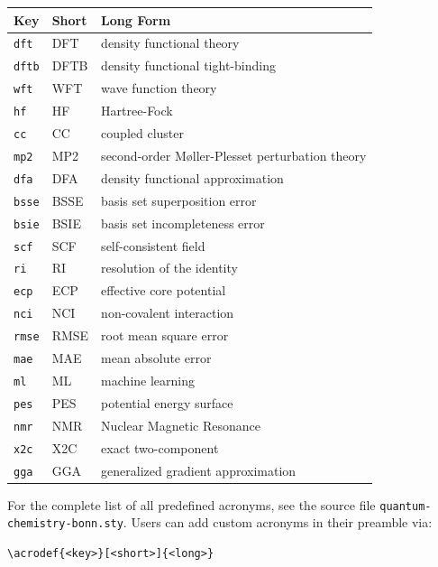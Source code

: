 \documentclass[a4paper,12pt]{article}
\begin{document}
\bigskip
\begin{tabular}{@{}llp{7.5cm}@{}}
\textbf{Key} & \textbf{Short} & \textbf{Long Form} \\
\midrule
\texttt{dft}   & DFT     & density functional theory \\
\texttt{dftb}  & DFTB    & density functional tight-binding \\
\texttt{wft}   & WFT     & wave function theory \\
\texttt{hf}    & HF      & Hartree-Fock \\
\texttt{cc}    & CC      & coupled cluster \\
\texttt{mp2}   & MP2     & second-order M{\o}ller-Plesset perturbation theory \\
\texttt{dfa}   & DFA     & density functional approximation \\
\texttt{bsse}  & BSSE    & basis set superposition error \\
\texttt{bsie}  & BSIE    & basis set incompleteness error \\
\texttt{scf}   & SCF     & self-consistent field \\
\texttt{ri}    & RI      & resolution of the identity \\
\texttt{ecp}   & ECP     & effective core potential \\
\texttt{nci}   & NCI     & non-covalent interaction \\
\texttt{rmse}  & RMSE    & root mean square error \\
\texttt{mae}   & MAE     & mean absolute error \\
\texttt{ml}    & ML      & machine learning \\
\texttt{pes}   & PES     & potential energy surface \\
\texttt{nmr}   & NMR     & Nuclear Magnetic Resonance \\
\texttt{x2c}   & X2C     & exact two-component \\
\texttt{gga}   & GGA     & generalized gradient approximation \\
\end{tabular}

\bigskip
\noindent For the complete list of all predefined acronyms, see the
source file \texttt{quantum-chemistry-bonn.sty}.
Users can add custom acronyms in their preamble via:
\begin{verbatim}
\acrodef{<key>}[<short>]{<long>}
\end{verbatim}

\end{document}
